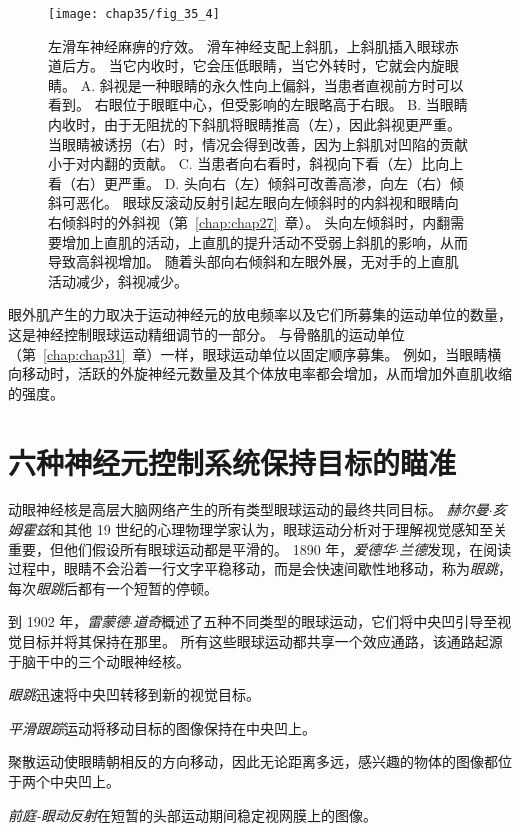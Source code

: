 \begin{figure}[htbp]
	\centering
	\texttt{[image: chap35/fig\_35\_4]}
	\caption{左滑车神经麻痹的疗效。
		滑车神经支配上斜肌，上斜肌插入眼球赤道后方。
		当它内收时，它会压低眼睛，当它外转时，它就会内旋眼睛。
		A. 斜视是一种眼睛的永久性向上偏斜，当患者直视前方时可以看到。
		右眼位于眼眶中心，但受影响的左眼略高于右眼。
		B. 当眼睛内收时，由于无阻扰的下斜肌将眼睛推高（左），因此斜视更严重。
		当眼睛被诱拐（右）时，情况会得到改善，因为上斜肌对凹陷的贡献小于对内翻的贡献。
		C. 当患者向右看时，斜视向下看（左）比向上看（右）更严重。
		D. 头向右（左）倾斜可改善高渗，向左（右）倾斜可恶化。
		眼球反滚动反射引起左眼向左倾斜时的内斜视和眼睛向右倾斜时的外斜视（第~\ref{chap:chap27}~章）。
		头向左倾斜时，内翻需要增加上直肌的活动，上直肌的提升活动不受弱上斜肌的影响，从而导致高斜视增加。
		随着头部向右倾斜和左眼外展，无对手的上直肌活动减少，斜视减少。}
	\label{fig:35_4}
\end{figure}


眼外肌产生的力取决于运动神经元的放电频率以及它们所募集的运动单位的数量，这是神经控制眼球运动精细调节的一部分。
与骨骼肌的运动单位（第~\ref{chap:chap31}~章）一样，眼球运动单位以固定顺序募集。
例如，当眼睛横向移动时，活跃的外旋神经元数量及其个体放电率都会增加，从而增加外直肌收缩的强度。



\section{六种神经元控制系统保持目标的瞄准}

动眼神经核是高层大脑网络产生的所有类型眼球运动的最终共同目标。
\textit{赫尔曼$\cdot$亥姆霍兹}和其他 19 世纪的心理物理学家认为，眼球运动分析对于理解视觉感知至关重要，但他们假设所有眼球运动都是平滑的。
1890 年，\textit{爱德华$\cdot$兰德}发现，在阅读过程中，眼睛不会沿着一行文字平稳移动，而是会快速间歇性地移动，称为\textit{眼跳}，每次\textit{眼跳}后都有一个短暂的停顿。


到 1902 年，\textit{雷蒙德$\cdot$道奇}概述了五种不同类型的眼球运动，它们将中央凹引导至视觉目标并将其保持在那里。
所有这些眼球运动都共享一个效应通路，该通路起源于脑干中的三个动眼神经核。


\textit{眼跳}迅速将中央凹转移到新的视觉目标。


\textit{平滑跟踪}运动将移动目标的图像保持在中央凹上。


聚散运动使眼睛朝相反的方向移动，因此无论距离多远，感兴趣的物体的图像都位于两个中央凹上。


\textit{前庭-眼动反射}在短暂的头部运动期间稳定视网膜上的图像。


